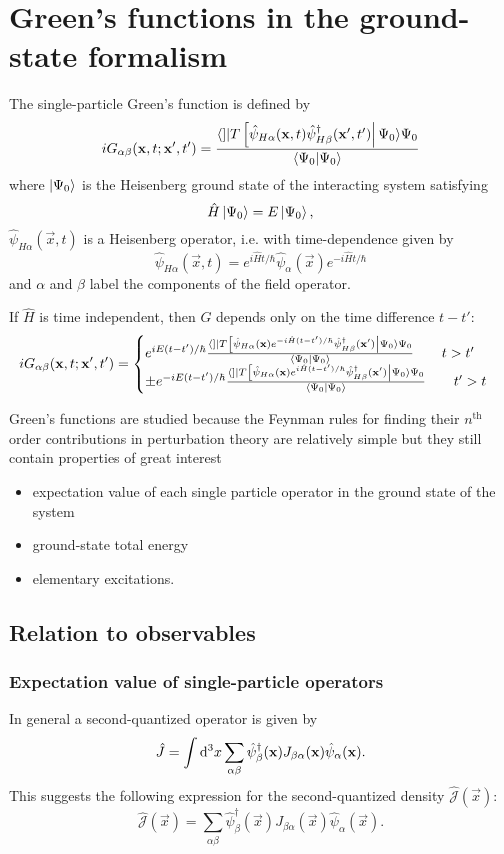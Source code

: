 \chapter{Green's functions in the ground-state formalism}
The single-particle Green's function is defined by
\[ i G_{\alpha\beta}(\vec{x},t;\vec{x}', t') = \frac{\braket[T \left[\hat{\psi}_{H\alpha}(\vec{x},t)\hat{\psi}^\dagger_{H\beta}(\vec{x}',t')\right]]{\Psi_0}{\Psi_0}}{\braket{\Psi_0}{\Psi_0}} \]
where $\left| \Psi_0 \right\rangle$ is the Heisenberg ground state of the interacting system satisfying
\[ \hat{H}\left| \Psi_0 \right\rangle = E\left| \Psi_0 \right\rangle, \]
$\hat{\psi}_{H\alpha}(\vec{x},t)$ is a Heisenberg operator, i.e. with time-dependence given by
\[ \hat{\psi}_{H\alpha}(\vec{x},t) = e^{i\hat{H}t/\hbar}\hat{\psi}_\alpha(\vec{x})e^{-i\hat{H}t/\hbar} \]
and $\alpha$ and $\beta$ label the components of the field operator.

If $\hat{H}$ is time independent, then $G$ depends only on the time difference $t-t'$:
\[ i G_{\alpha\beta}(\vec{x},t;\vec{x}', t') = \begin{cases}
e^{iE(t-t')/\hbar}\frac{\braket[T \left[\hat{\psi}_{H\alpha}(\vec{x})e^{-i \hat{H}(t-t')/\hbar}\hat{\psi}^\dagger_{H\beta}(\vec{x}')\right]]{\Psi_0}{\Psi_0}}{\braket{\Psi_0}{\Psi_0}} \qquad t>t' \\
\pm e^{-iE(t-t')/\hbar}\frac{\braket[T \left[\hat{\psi}_{H\alpha}(\vec{x})e^{i \hat{H}(t-t')/\hbar}\hat{\psi}^\dagger_{H\beta}(\vec{x}')\right]]{\Psi_0}{\Psi_0}}{\braket{\Psi_0}{\Psi_0}} \qquad t'>t
\end{cases} \]

Green's functions are studied because the Feynman rules for finding their $n^\text{th}$ order contributions in perturbation theory are relatively simple but they still contain properties of great interest
\begin{itemize}
\item expectation value of each single particle operator in the ground state of the system
\item ground-state total energy
\item elementary excitations.
\end{itemize}

\section{Relation to observables}
\subsection{Expectation value of single-particle operators}
In general a second-quantized operator is given by
\[ \hat{J} = \int \operatorname{d \!}{^3x}\sum_{\alpha\beta}\hat{\psi}^\dagger_\beta(\bm{\mathrm{x}})J_{\beta\alpha}(\bm{\mathrm{x}})\hat{\psi}_\alpha(\bm{\mathrm{x}}). \]
This suggests the following expression for the second-quantized density $\hat{\mathcal{J}}(\vec{x})$:
\[\hat{\mathcal{J}}(\vec{x}) = \sum_{\alpha\beta}\hat{\psi}^\dagger_\beta(\vec{x})J_{\beta\alpha}(\vec{x})\hat{\psi}_\alpha(\vec{x}).\]

